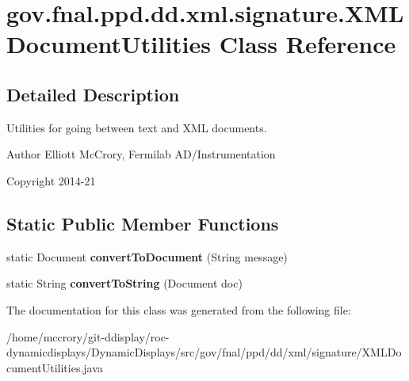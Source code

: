 \hypertarget{classgov_1_1fnal_1_1ppd_1_1dd_1_1xml_1_1signature_1_1XMLDocumentUtilities}{\section{gov.\-fnal.\-ppd.\-dd.\-xml.\-signature.\-X\-M\-L\-Document\-Utilities Class Reference}
\label{classgov_1_1fnal_1_1ppd_1_1dd_1_1xml_1_1signature_1_1XMLDocumentUtilities}
}


\subsection{Detailed Description}
Utilities for going between text and X\-M\-L documents.

\begin{DoxyAuthor}{Author}
Elliott Mc\-Crory, Fermilab A\-D/\-Instrumentation 
\end{DoxyAuthor}
\begin{DoxyCopyright}{Copyright}
2014-\/21 
\end{DoxyCopyright}
\subsection*{Static Public Member Functions}
\begin{DoxyCompactItemize}
\item 
\hypertarget{classgov_1_1fnal_1_1ppd_1_1dd_1_1xml_1_1signature_1_1XMLDocumentUtilities_a5113e903c8c8049153bc4b3d6c43da1a}{static Document {\bfseries convert\-To\-Document} (String message)}\label{classgov_1_1fnal_1_1ppd_1_1dd_1_1xml_1_1signature_1_1XMLDocumentUtilities_a5113e903c8c8049153bc4b3d6c43da1a}

\item 
\hypertarget{classgov_1_1fnal_1_1ppd_1_1dd_1_1xml_1_1signature_1_1XMLDocumentUtilities_a9eed59a958a4e4e56f1b7dcc904cbc90}{static String {\bfseries convert\-To\-String} (Document doc)}\label{classgov_1_1fnal_1_1ppd_1_1dd_1_1xml_1_1signature_1_1XMLDocumentUtilities_a9eed59a958a4e4e56f1b7dcc904cbc90}

\end{DoxyCompactItemize}


The documentation for this class was generated from the following file\-:\begin{DoxyCompactItemize}
\item 
/home/mccrory/git-\/ddisplay/roc-\/dynamicdisplays/\-Dynamic\-Displays/src/gov/fnal/ppd/dd/xml/signature/X\-M\-L\-Document\-Utilities.\-java\end{DoxyCompactItemize}
